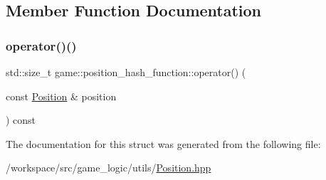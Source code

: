 \subsection{Member Function Documentation}
\mbox{\label{structgame_1_1position__hash__function_a94c3eb284abc54e42be05e885bff4d9f}} 
\subsubsection{\texorpdfstring{operator()()}{operator()()}}
{\footnotesize\ttfamily std\+::size\+\_\+t game\+::position\+\_\+hash\+\_\+function\+::operator() (\begin{DoxyParamCaption}\item[{const \hyperlink{structgame_1_1_position}{Position} \&}]{position }\end{DoxyParamCaption}) const\hspace{0.3cm}{\ttfamily [inline]}}



The documentation for this struct was generated from the following file\+:\begin{DoxyCompactItemize}
\item 
/workspace/src/game\+\_\+logic/utils/\hyperlink{_position_8hpp}{Position.\+hpp}\end{DoxyCompactItemize}
